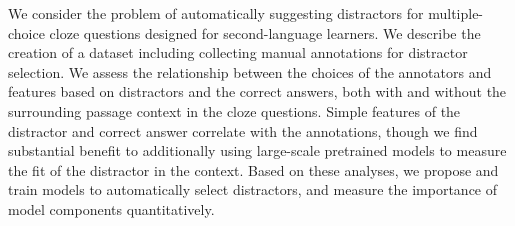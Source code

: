 We consider the problem of automatically suggesting distractors for multiple-choice cloze questions designed for second-language learners. We describe the creation of a dataset including collecting manual annotations for distractor selection. We assess the relationship between the choices of the annotators and features based on distractors and the correct answers, both with and without the surrounding passage context in the cloze questions. Simple features of the distractor and correct answer correlate with the annotations, though we find substantial benefit to additionally using large-scale pretrained models to measure the fit of the distractor in the context. Based on these analyses, we propose and train models to automatically select distractors, and measure the importance of model components quantitatively.
